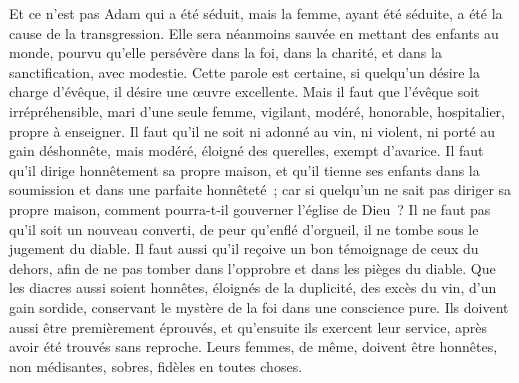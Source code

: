 \begin{multicols}{2}
Et ce n'est pas Adam qui a été séduit, mais la femme, ayant été séduite, a été la cause de la transgression.
Elle sera néanmoins sauvée en mettant des enfants au monde, pourvu qu'elle persévère dans la foi, dans la charité, et dans la sanctification, avec modestie.
\VerseOne{}Cette parole est certaine, si quelqu'un désire la charge d'évêque, il désire une œuvre excellente.
Mais il faut que l'évêque soit irrépréhensible, mari d'une seule femme, vigilant, modéré, honorable, hospitalier, propre à enseigner.
Il faut qu'il ne soit ni adonné au vin, ni violent, ni porté au gain déshonnête, mais modéré, éloigné des querelles, exempt d'avarice.
Il faut qu'il dirige honnêtement sa propre maison, et qu'il tienne ses enfants dans la soumission et dans une parfaite honnêteté~;
car si quelqu'un ne sait pas diriger sa propre maison, comment pourra-t-il gouverner l'église de Dieu~?
Il ne faut pas qu'il soit un nouveau converti, de peur qu'enflé d'orgueil, il ne tombe sous le jugement du diable.
Il faut aussi qu'il reçoive un bon témoignage de ceux du dehors, afin de ne pas tomber dans l'opprobre et dans les pièges du diable.
Que les diacres aussi soient honnêtes, éloignés de la duplicité, des excès du vin, d'un gain sordide,
conservant le mystère de la foi dans une conscience pure.
Ils doivent aussi être premièrement éprouvés, et qu'ensuite ils exercent leur service, après avoir été trouvés sans reproche.
Leurs femmes, de même, doivent être honnêtes, non médisantes, sobres, fidèles en toutes choses.

\end{multicols}
